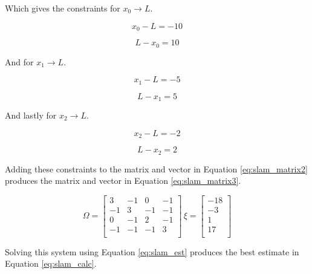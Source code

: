 Which gives the constraints for $x_0 \rightarrow L$.

\begin{equation}
\label{eq:slam_lan_cons1_a}
x_0 - L = -10
\end{equation}

\begin{equation}
\label{eq:slam_lan_cons1_b}
L - x_0 = 10
\end{equation}

And for $x_1 \rightarrow L$.

\begin{equation}
\label{eq:slam_lan_cons2_a}
x_1 - L = -5
\end{equation}

\begin{equation}
\label{eq:slam_lan_cons2_b}
L - x_1 = 5
\end{equation}

And lastly for $x_2 \rightarrow L$.

\begin{equation}
\label{eq:slam_lan_cons3_a}
x_2 - L = -2
\end{equation}

\begin{equation}
\label{eq:slam_lan_cons3_b}
L - x_2 = 2
\end{equation}

Adding these constraints to the matrix and vector in Equation \ref{eq:slam_matrix2} produces the matrix and vector in Equation \ref{eq:slam_matrix3}.

\begin{equation}
\Omega =
\label{eq:slam_matrix3}
\begin{bmatrix}
3 & -1 & 0 & -1 \\
-1 & 3 & -1 & -1 \\
0 & -1 & 2 & -1 \\
-1 & -1 & -1 & 3 \\
\end{bmatrix}\,
\xi =
\begin{bmatrix}
-18 \\
-3 \\
1 \\
17 \\
\end{bmatrix}
\end{equation}

Solving this system using Equation \ref{eq:slam_est} produces the best estimate in Equation \ref{eq:slam_calc}.

